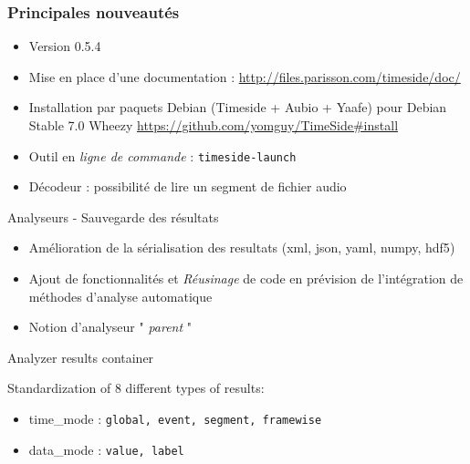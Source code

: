 \documentclass[10pt, final, hyperref, table]{beamer}
\begin{document}
\begin{frame}
  \frametitle{Principales nouveautés}
  \begin{block}{}
    \begin{itemize}
    \item Version 0.5.4 
    \item Mise en place d'une documentation :
      \url{http://files.parisson.com/timeside/doc/}
   
    \item Installation par paquets Debian (Timeside + Aubio + Yaafe)
      pour Debian Stable 7.0 Wheezy
      \url{https://github.com/yomguy/TimeSide\#install}
    \item Outil en \emph{ligne de commande} : \texttt{timeside-launch}
    \item Décodeur : possibilité de lire un \alert{segment} de fichier audio
    \end{itemize}
  \end{block}
  \begin{block}{Analyseurs - Sauvegarde des résultats}
    \begin{itemize}
    \item Amélioration de la sérialisation des resultats (xml, json,
      yaml, \alert{numpy}, \alert{hdf5})
    \item  Ajout de fonctionnalités et \emph{Réusinage} de code en prévision de l'intégration de méthodes d'analyse automatique
    \item Notion d'analyseur " \emph{parent} "
    \end{itemize}
    
  \end{block}
\end{frame}

\begin{frame}{Analyzer results container}
\begin{block}{}
  Standardization of 8 different types of results:
  \begin{itemize}
  \item time\_mode : \texttt{global, event, segment, framewise}
  \item data\_mode : \texttt{value, label}
  \end{itemize}
\end{block}
\end{frame}
\end{document}
